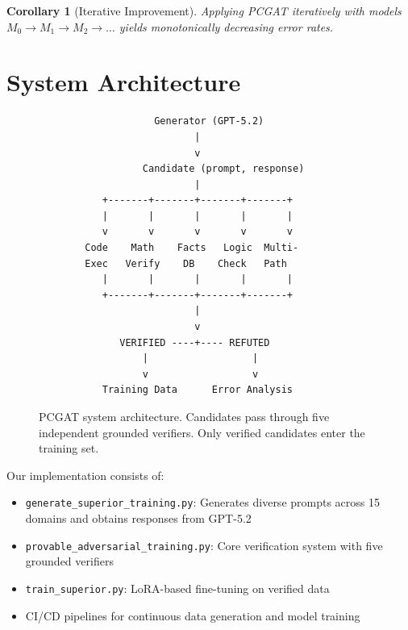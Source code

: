\documentclass[11pt,a4paper]{article}
\newtheorem{corollary}[theorem]{Corollary}
\begin{document}
\begin{corollary}[Iterative Improvement]
\label{cor:iterative}
Applying PCGAT iteratively with models $M_0 \to M_1 \to M_2 \to \ldots$ yields monotonically decreasing error rates.
\end{corollary}

\section{System Architecture}
\label{sec:system}

\begin{figure}[t]
\centering
\begin{tcolorbox}[width=\textwidth, colback=gray!5]
\begin{verbatim}
                    Generator (GPT-5.2)
                           |
                           v
                  Candidate (prompt, response)
                           |
           +-------+-------+-------+-------+
           |       |       |       |       |
           v       v       v       v       v
        Code    Math    Facts   Logic  Multi-
        Exec   Verify    DB    Check   Path
           |       |       |       |       |
           +-------+-------+-------+-------+
                           |
                           v
              VERIFIED ----+---- REFUTED
                  |                  |
                  v                  v
           Training Data      Error Analysis
\end{verbatim}
\end{tcolorbox}
\caption{PCGAT system architecture. Candidates pass through five independent grounded verifiers. Only verified candidates enter the training set.}
\label{fig:architecture}
\end{figure}

Our implementation consists of:

\begin{itemize}
    \item \texttt{generate\_superior\_training.py}: Generates diverse prompts across 15 domains and obtains responses from GPT-5.2
    \item \texttt{provable\_adversarial\_training.py}: Core verification system with five grounded verifiers
    \item \texttt{train\_superior.py}: LoRA-based fine-tuning on verified data
    \item CI/CD pipelines for continuous data generation and model training
\end{itemize}
\end{document}
